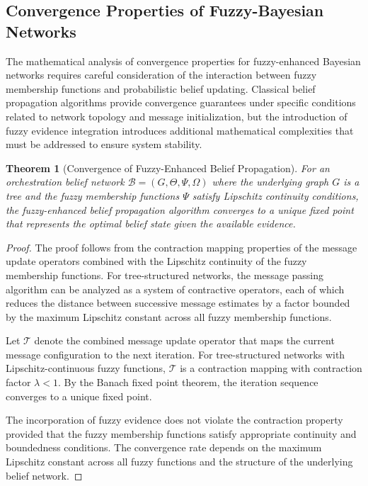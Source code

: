 \documentclass[12pt,a4paper]{article}
\newtheorem{theorem}{Theorem}[section]
\begin{document}
\subsection{Convergence Properties of Fuzzy-Bayesian Networks}

The mathematical analysis of convergence properties for fuzzy-enhanced Bayesian networks requires careful consideration of the interaction between fuzzy membership functions and probabilistic belief updating. Classical belief propagation algorithms provide convergence guarantees under specific conditions related to network topology and message initialization, but the introduction of fuzzy evidence integration introduces additional mathematical complexities that must be addressed to ensure system stability.

\begin{theorem}[Convergence of Fuzzy-Enhanced Belief Propagation]
For an orchestration belief network $\mathcal{B} = (G, \Theta, \Psi, \Omega)$ where the underlying graph $G$ is a tree and the fuzzy membership functions $\Psi$ satisfy Lipschitz continuity conditions, the fuzzy-enhanced belief propagation algorithm converges to a unique fixed point that represents the optimal belief state given the available evidence.
\end{theorem}

\begin{proof}
The proof follows from the contraction mapping properties of the message update operators combined with the Lipschitz continuity of the fuzzy membership functions. For tree-structured networks, the message passing algorithm can be analyzed as a system of contractive operators, each of which reduces the distance between successive message estimates by a factor bounded by the maximum Lipschitz constant across all fuzzy membership functions.

Let $\mathcal{T}$ denote the combined message update operator that maps the current message configuration to the next iteration. For tree-structured networks with Lipschitz-continuous fuzzy functions, $\mathcal{T}$ is a contraction mapping with contraction factor $\lambda < 1$. By the Banach fixed point theorem, the iteration sequence converges to a unique fixed point.

The incorporation of fuzzy evidence does not violate the contraction property provided that the fuzzy membership functions satisfy appropriate continuity and boundedness conditions. The convergence rate depends on the maximum Lipschitz constant across all fuzzy functions and the structure of the underlying belief network.
\end{proof}
\end{document}
